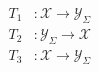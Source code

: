 \documentclass[border=4pt]{standalone}
\begin{document}
\Large
$\displaystyle
\begin{aligned}
T_1 &: \mathcal{X} \rightarrow \mathcal{Y}_{\Sigma} \\
T_2 &: \mathcal{Y}_{\Sigma} \rightarrow \mathcal{X} \\
T_3 &: \mathcal{X} \rightarrow \mathcal{Y}_{\Sigma}
\end{aligned}$
\end{document}
